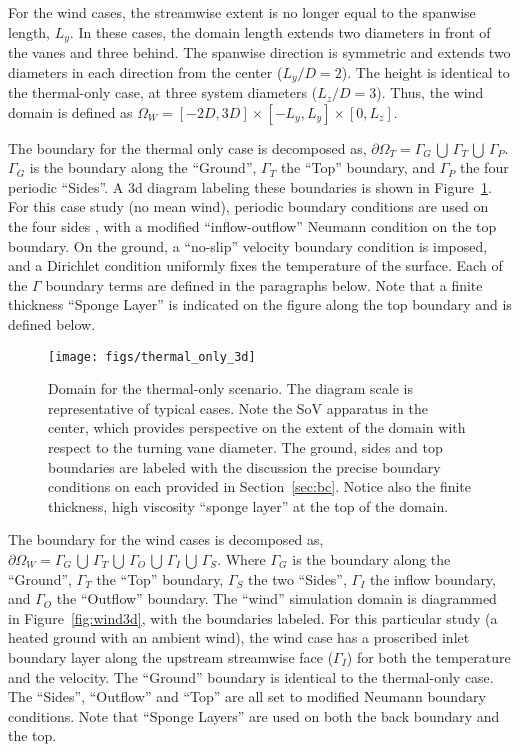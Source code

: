 For the wind cases, the streamwise extent is no longer equal to
the spanwise length, $L_y$. In these cases, the domain length extends
two diameters in front of the vanes and three behind. The
spanwise direction is symmetric and extends two diameters in each direction 
from the center ($L_y/D = 2$). The height is identical to the
thermal-only case, at three system diameters ($L_z/D = 3$). Thus, the
wind domain is defined as $\Omega_W = \left[-2D,3D \right] \times
\left[-L_y,L_y \right] \times \left[0,L_z \right]$.   

The boundary for the thermal only case is decomposed as,
$\partial \Omega_T = \Gamma_G \, \bigcup \, \Gamma_T \, \bigcup \, \Gamma_P $. 
$\Gamma_G$ is the boundary along the ``Ground'', $\Gamma_T$
the ``Top'' boundary, and $\Gamma_P$ the four periodic ``Sides''. A 3d
diagram labeling these boundaries is shown in
Figure~\ref{fig:thermal3d}. For this case study (no mean wind),
periodic boundary conditions are used on the four sides , with a modified 
``inflow-outflow'' Neumann condition\cite{gunzburger1989finite} on the
top boundary. On the ground, a ``no-slip'' velocity boundary condition is
imposed, and a Dirichlet condition uniformly fixes
the temperature of the surface. 
Each of the $\Gamma$ boundary terms are defined in the paragraphs below. 
Note that a finite thickness ``Sponge Layer'' is
indicated on the figure along the top boundary and is defined below. 

\begin{figure}[!htb]
  \begin{center}
    \texttt{[image: figs/thermal\_only\_3d]}
    \caption{Domain for the thermal-only
   scenario. The diagram scale is representative of typical cases. Note
   the SoV apparatus in the center, which provides perspective on the
   extent of the domain with respect to the turning vane diameter. The
   ground, sides and top boundaries are labeled with the discussion the
   precise boundary conditions on each provided in
   Section~\ref{sec:bc}. Notice also the finite thickness, high
   viscosity ``sponge layer'' at the top of the domain.} 
    \label{fig:thermal3d}
  \end{center}
\end{figure}

The boundary for the wind cases is decomposed as,
$\partial \Omega_W = \Gamma_G \, \bigcup \, \Gamma_T \, \bigcup \,
\Gamma_O \, \bigcup \, \Gamma_I \, \bigcup \, \Gamma_S $.  
Where $\Gamma_G$ is the boundary along the ``Ground'',
$\Gamma_T$ the ``Top'' boundary, $\Gamma_S$ the two ``Sides'',
$\Gamma_I$ the inflow boundary, and $\Gamma_O$ the ``Outflow''  
boundary.
The ``wind'' simulation domain is diagrammed in
Figure~\ref{fig:wind3d}, with the boundaries labeled. 
For this particular study (a heated ground with 
an ambient wind), the wind case has a proscribed inlet boundary layer
along the upstream streamwise face ($\Gamma_I$) for both the temperature
and the velocity. The ``Ground'' boundary is identical to
the thermal-only case. The ``Sides'', ``Outflow'' and ``Top'' are all
set to modified Neumann boundary conditions. Note that ``Sponge Layers''
are used on both the back boundary and the top. 

